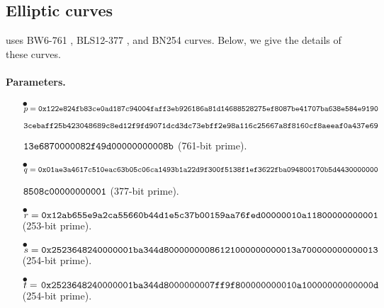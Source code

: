 \subsection{Elliptic curves}
\label{sec:cryptographic-primitives:elliptic-curves}

\davinci uses BW6-761 \cite{elhousni20optimized}, BLS12-377 \cite{bowe20zexe},  and BN254 \cite{jancar20bn256} curves. Below, we give the details of these curves.

\paragraph{Parameters.}

\begin{itemize}
	\item[$\bullet$] $p = \tt{0x122e824fb83ce0ad187c94004faff3eb926186a81d14688528275ef8087be41707ba638e584e9190}$
	\item[] \hspace{0.53cm} $\tt{3cebaff25b423048689c8ed12f9fd9071dcd3dc73ebff2e98a116c25667a8f8160cf8aeeaf0a437e69}$
	\item[] \hspace{0.53cm} $\tt{13e6870000082f49d00000000008b}$ (761-bit prime).
	\item[$\bullet$] $q = \tt{0x01ae3a4617c510eac63b05c06ca1493b1a22d9f300f5138f1ef3622fba094800170b5d4430000000}$
	\item[] \hspace{0.52cm} $\tt{8508c00000000001}$ (377-bit prime).
	\item[$\bullet$] $r = \tt{0x12ab655e9a2ca55660b44d1e5c37b00159aa76fed00000010a11800000000001}$ (253-bit prime).
	\item[$\bullet$] $s = \tt{0x2523648240000001ba344d80000000086121000000000013a700000000000013}$ (254-bit prime).
	\item[$\bullet$] $t = \tt{\hspace{0.04cm}0x2523648240000001ba344d8000000007ff9f800000000010a10000000000000d}$ (254-bit prime).
\end{itemize}

